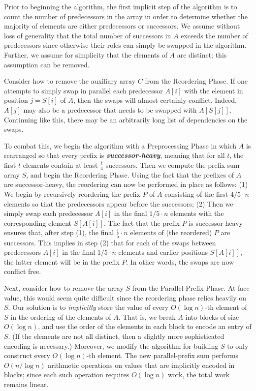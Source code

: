 \documentclass[sigconf, 10pt, nonacm]{acmart}
\newcommand{\defn}[1]{{\textit{\textbf{\boldmath #1}}}}
\renewcommand{\paragraph}[1]{\vspace{0.09in}\noindent{\bf \boldmath #1.}}
\theoremstyle{remark}
\theoremstyle{remark}
\begin{document}
\paragraph{Algorithm Outline}
Prior to beginning the algorithm, the first implicit step of the
algorithm is to count the number of predecessors in the array in
order to determine whether the majority of elements are either
predecessors or successors. We assume without loss of generality that the total
number of successors in $A$ exceeds the number of predecessors since otherwise
their roles can simply be swapped in the algorithm. Further, we assume for
simplicity that the elements of $A$ are distinct; this assumption can be removed.

Consider how to remove the auxiliary array $C$ from the Reordering
Phase. If one attempts to simply swap in parallel each predecessor
$A[i]$ with the element in position $j = S[i]$ of $A$, then the swaps
will almost certainly conflict. Indeed, $A[j]$ may also be a
predecessor that needs to be swapped with $A[S[j]]$. Continuing like
this, there may be an arbitrarily long list of dependencies on the
swaps.

To combat this, we begin the algorithm with a Preprocessing Phase in
which $A$ is rearranged so that every prefix is
\defn{successor-heavy}, meaning that for all $t$, the first $t$
elements contain at least $\frac{t}{4}$ successors. Then we compute
the prefix-sum array $S$, and begin the Reordering Phase. Using the
fact that the prefixes of $A$ are successor-heavy, the reordering can
now be performed in place as follows: (1) We begin by recursively
reordering the prefix $P$ of $A$ consisting of the first $4/5 \cdot n$
elements so that the predecessors appear before the successors; (2)
Then we simply swap each predecessor $A[i]$ in the final $1/5 \cdot n$
elements with the corresponding element $S[A[i]]$. The fact that the
prefix $P$ is successor-heavy ensures that, after step (1), the final 
$\frac{1}{5} \cdot n$ elements of (the reordered) $P$ are successors. 
This implies in step (2) that for each of the swaps between predecessors $A[i]$
in the final $1/5 \cdot n$ elements and earlier positions $S[A[i]]$, the latter
element will be in the prefix $P$. In other words, the swaps are now conflict
free.

Next, consider how to remove the array $S$ from the Parallel-Prefix
Phase. At face value, this would seem quite difficult since the
reordering phase relies heavily on $S$. Our solution is to
\emph{implicitly} store the value of every $O(\log n)$-th element of
$S$ in the ordering of the elements of $A$. That is, we break $A$ into
blocks of size $O(\log n)$, and use the order of the elements in each
block to encode an entry of $S$. (If the elements are not all
  distinct, then a slightly more sophisticated encoding is necessary.)
Moreover, we modify the algorithm for building $S$ to only construct
every $O(\log n)$-th element. The new parallel-prefix sum performs
$O(n / \log n)$ arithmetic operations on values that are implicitly
encoded in blocks; since each such operation requires $O(\log n)$
work, the total work remains linear.
\end{document}
